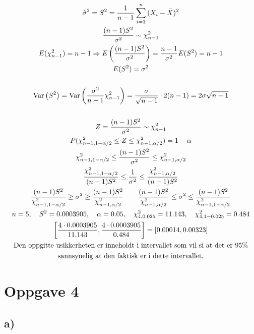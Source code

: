 \begin{gather*}
	\hat \sigma^2 = S^2 = \frac{1}{n - 1} \sum_{i = 1}^{n}{(X_i - \bar X)^2}
	\\
	\frac{(n - 1) S^2}{\sigma^2} \sim \chi^2_{n - 1}
	\\
	E(\chi^2_{n - 1}) = n - 1
	\Rightarrow
	E\left(\frac{(n - 1) S^2}{\sigma^2}\right) = \frac{n - 1}{\sigma^2} E(S^2) = n - 1
	\\
	E(S^2) = \sigma^2
	\\
	\\
	\text{Var}\left(S^2\right) = \text{Var}\left(\frac{\sigma^2}{n - 1} \chi_{n - 1}^2\right) = \frac{\sigma}{\sqrt{n - 1}} \cdot 2 (n - 1) = 2 \sigma \sqrt{n - 1}
	\\
	\\
	Z = \frac{(n - 1) S^2}{\sigma^2} \sim \chi^2_{n - 1}
	\\
	P(\chi^2_{n - 1, 1 - \alpha / 2} \leq Z \leq \chi^2_{n - 1, \alpha / 2}) = 1 - \alpha
	\\
	\chi^2_{n - 1, 1 - \alpha / 2} \leq \frac{(n - 1) S^2}{\sigma^2} \leq \chi^2_{n - 1, \alpha / 2}
	\\
	\frac{\chi^2_{n - 1, 1 - \alpha / 2}}{(n - 1)S^2} \leq \frac{1}{\sigma^2} \leq \frac{\chi^2_{n - 1, \alpha / 2}}{(n - 1)S^2}
	\\
	\frac{(n - 1)S^2}{\chi^2_{n - 1, 1 - \alpha / 2}} \geq \sigma^2 \geq \frac{(n - 1)S^2}{\chi^2_{n - 1, \alpha / 2}}
	\qquad
	\frac{(n - 1)S^2}{\chi^2_{n - 1, \alpha / 2}} \leq \sigma^2 \leq \frac{(n - 1)S^2}{\chi^2_{n - 1, 1 - \alpha / 2}}
	\\
	n = 5, \quad S^2 = 0.0003905, \quad \alpha = 0.05, \quad \chi^2_{4, 0.025} = 11.143, \quad \chi^2_{4, 1 - 0.025} = 0.484
	\\
	\left[\frac{4 \cdot 0.0003905}{11.143}, \frac{4 \cdot 0.0003905}{0.484}\right] = \left[0.00014, 0.00323\right]
	\\
	\text{Den oppgitte usikkerheten er inneholdt i intervallet som vil si at det er 95\%}\\ \text{sannsynelig at den faktisk er i dette intervallet.}
\end{gather*}


\section*{Oppgave 4}

\subsection*{a)}

